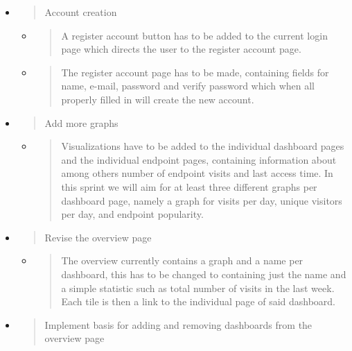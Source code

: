 \begin{itemize}
\item
  \begin{quote}
  Account creation
  \end{quote}

  \begin{itemize}
  \item
    \begin{quote}
    A register account button has to be added to the current login page
    which directs the user to the register account page.
    \end{quote}
  \item
    \begin{quote}
    The register account page has to be made, containing fields for
    name, e-mail, password and verify password which when all properly
    filled in will create the new account.
    \end{quote}
  \end{itemize}
\item
  \begin{quote}
  Add more graphs
  \end{quote}

  \begin{itemize}
  \item
    \begin{quote}
    Visualizations have to be added to the individual dashboard pages
    and the individual endpoint pages, containing information about
    among others number of endpoint visits and last access time. In this
    sprint we will aim for at least three different graphs per dashboard
    page, namely a graph for visits per day, unique visitors per day,
    and endpoint popularity.
    \end{quote}
  \end{itemize}
\item
  \begin{quote}
  Revise the overview page
  \end{quote}

  \begin{itemize}
  \item
    \begin{quote}
    The overview currently contains a graph and a name per dashboard,
    this has to be changed to containing just the name and a simple
    statistic such as total number of visits in the last week. Each tile
    is then a link to the individual page of said dashboard.
    \end{quote}
  \end{itemize}
\item
  \begin{quote}
  Implement basis for adding and removing dashboards from the overview
  page
  \end{quote}


\end{itemize}
